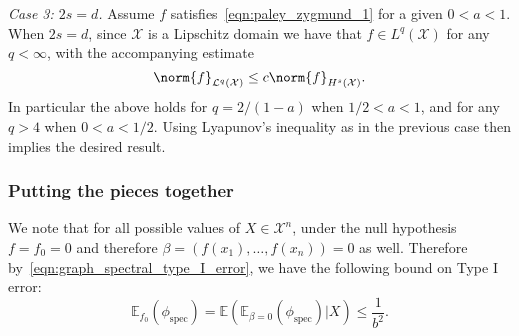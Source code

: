 \documentclass{article}
\newcommand{\1}{\mathbf{1}}
\newcommand{\Xset}{\mathcal{X}}
\newcommand{\Leb}{\mathcal{L}}
\newcommand{\Ebb}{\mathbb{E}}
\newcommand{\spec}{\mathrm{spec}}
\theoremstyle{alden}
\theoremstyle{aldenthm}
\theoremstyle{definition}
\theoremstyle{remark}
\begin{document}
\textit{Case 3: $2s = d$.}
Assume $f$ satisfies~\eqref{eqn:paley_zygmund_1} for a given $0 < a < 1$. When $2s = d$, since $\Xset$ is a Lipschitz domain we have that $f \in L^q(\Xset)$ for any $q < \infty$, with the accompanying estimate
\begin{equation*}
\norm{f}_{\Leb^q(\Xset)} \leq c \norm{f}_{H^s(\Xset)}.
\end{equation*}
In particular the above holds for $q = 2/(1 - a)$ when $1/2 < a < 1$, and for any $q > 4$ when $0 < a < 1/2$. Using Lyapunov's inequality as in the previous case then implies the desired result.

\subsubsection{Putting the pieces together}
\label{subsubsec:sobolev_testing_rate_pf_conclusion}

We note that for all possible values of $X \in \Xset^n$, under the null hypothesis $f = f_0 = 0$ and therefore $\beta = (f(x_1),\ldots,f(x_n)) = 0$ as well. Therefore by~\eqref{eqn:graph_spectral_type_I_error}, we have the following bound on Type I error:
\begin{equation}
\Ebb_{f_0}(\phi_{\mathrm{spec}}) = \mathbb{E}(\mathbb{E}_{\beta = 0}(\phi_{\spec}) | X) \leq \frac{1}{b^2}.
\end{equation}
\end{document}
